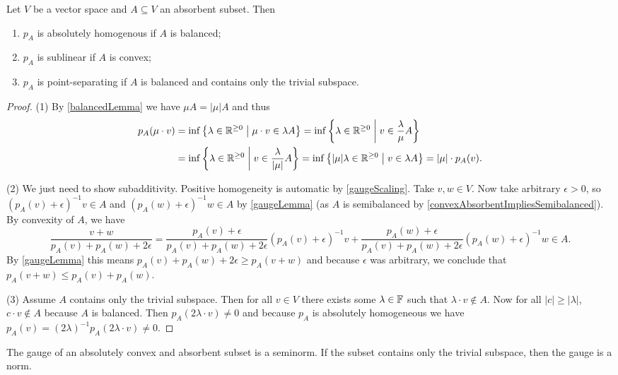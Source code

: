 \begin{proposition} \label{gaugeProperties}
Let $V$ be a vector space and $A\subseteq V$ an absorbent subset. Then
\begin{enumerate}
\item $p_A$ is absolutely homogenous if $A$ is balanced;
\item $p_A$ is sublinear if $A$ is convex;
\item $p_A$ is point-separating if $A$ is balanced and contains only the trivial subspace.
\end{enumerate}
\end{proposition}
\begin{proof}
(1) By \ref{balancedLemma} we have $\mu A = |\mu| A$ and thus
\begin{align*}
p_A(\mu\cdot v) &= \inf\setbuilder{\lambda\in \R^{\geq 0}}{\mu\cdot v\in \lambda A} = \inf\setbuilder{\lambda\in \R^{\geq 0}}{v\in \frac{\lambda}{\mu} A} \\
&= \inf\setbuilder{\lambda\in \R^{\geq 0}}{v\in \frac{\lambda}{|\mu|} A} = \inf\setbuilder{|\mu|\lambda\in \R^{\geq 0}}{v\in \lambda A} = |\mu|\cdot p_A(v).
\end{align*}

(2) We just need to show subadditivity. Positive homogeneity is automatic by \ref{gaugeScaling}. Take $v,w\in V$. Now take arbitrary $\epsilon > 0$, so $(p_A(v)+\epsilon)^{-1}v \in A$ and $(p_A(w)+\epsilon)^{-1}w \in A$ by \ref{gaugeLemma} (as $A$ is semibalanced by \ref{convexAbsorbentImpliesSemibalanced}). By convexity of $A$, we have
\[ \frac{v+w}{p_A(v)+p_A(w)+2\epsilon} = \frac{p_A(v)+\epsilon}{p_A(v)+p_A(w)+2\epsilon}(p_A(v)+\epsilon)^{-1}v + \frac{p_A(w)+\epsilon}{p_A(v)+p_A(w)+2\epsilon}(p_A(w)+\epsilon)^{-1}w \in A. \]
By \ref{gaugeLemma} this means $p_A(v)+p_A(w)+2\epsilon \geq p_A(v+w)$ and because $\epsilon$ was arbitrary, we conclude that $p_A(v+w) \leq p_A(v)+p_A(w)$.

(3) Assume $A$ contains only the trivial subspace. Then for all $v\in V$ there exists some $\lambda\in \mathbb{F}$ such that $\lambda\cdot v\notin A$. Now for all $|c|\geq |\lambda|$, $c\cdot v\notin A$ because $A$ is balanced. Then $p_A(2\lambda\cdot v) \neq 0$ and because $p_A$ is absolutely homogeneous we have $p_A(v) = (2\lambda)^{-1}p_A(2\lambda\cdot v) \neq 0$.
\end{proof}
\begin{corollary}
The gauge of an absolutely convex and absorbent subset is a seminorm. If the subset contains only the trivial subspace, then the gauge is a norm.
\end{corollary}


